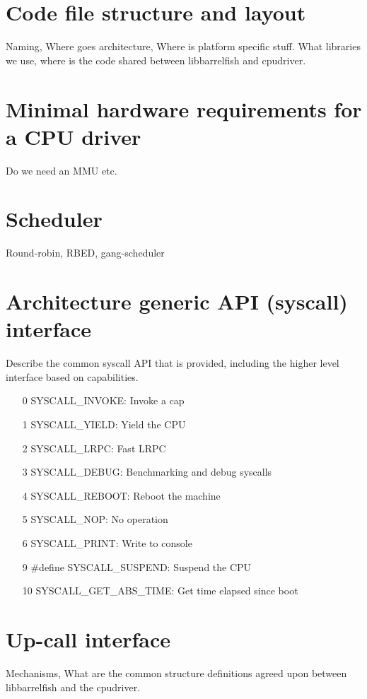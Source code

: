 \documentclass[a4paper,11pt,twoside]{report}
\begin{document}
{{\section{Code file structure and layout}
Naming, Where goes architecture, Where is platform specific stuff.
What libraries we use, where is the code shared between libbarrelfish
and cpudriver.

\section{Minimal hardware requirements for a CPU driver}
Do we need an MMU etc.

\section{Scheduler}
Round-robin, RBED, gang-scheduler

\section{Architecture generic API (syscall) interface}
Describe the common syscall API that is provided, including
the higher level interface based on capabilities.

\begin{itemize}
\item[0] SYSCALL_INVOKE: Invoke a cap
\item[1] SYSCALL_YIELD: Yield the CPU
\item[2] SYSCALL_LRPC: Fast LRPC
\item[3] SYSCALL_DEBUG: Benchmarking and debug syscalls
\item[4] SYSCALL_REBOOT: Reboot the machine
\item[5] SYSCALL_NOP: No operation
\item[6] SYSCALL_PRINT: Write to console
\item[9] #define SYSCALL_SUSPEND: Suspend the CPU
\item[10] SYSCALL_GET_ABS_TIME: Get time elapsed since boot

\end{itemize}


\section{Up-call interface}
Mechanisms, What are the common structure definitions agreed upon between
libbarrelfish and the cpudriver.



}}
\end{document}
